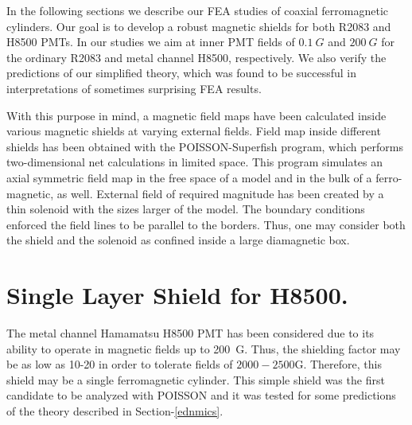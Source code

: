 \documentclass[12pt]{article}
\begin{document}
In the following  sections we describe our  FEA studies of coaxial ferromagnetic cylinders.
Our goal is to develop a  robust
magnetic shields for both  R2083 and H8500 PMTs. 
In our  studies we aim at inner PMT fields  of $0.1~G$ and $200~G$ for the ordinary R2083 and
metal channel  H8500, respectively.   We also  verify the predictions of our 
simplified theory, which was found to be successful in  interpretations of sometimes surprising FEA results.

With this purpose in mind, a magnetic field maps have  been calculated
inside  various magnetic shields at varying  external fields.
Field map inside different  shields has been  obtained with 
the POISSON-Superfish  program,  which performs two-dimensional net calculations 
in  limited space.  This program  simulates an axial symmetric 
field map in the free space of a  model and in the 
bulk of a ferro-magnetic, as well.  External  field of required magnitude  has been
created by a thin solenoid with  the sizes  larger of the model.
The boundary conditions enforced  the field lines to be parallel to the borders.
Thus, one may  consider  both the  shield and the  solenoid as 
confined   inside  a   large diamagnetic box.
 
%





\section{Single Layer Shield for H8500.}
The metal channel Hamamatsu H8500 PMT has been 
considered due to its ability to operate in magnetic fields up to 200~G.
Thus, the shielding factor may be as low as 10-20 in order to tolerate
 fields of $2000-2500$G. Therefore, this shield may be a  single  ferromagnetic cylinder.  
This simple shield  was  the first candidate to be analyzed  with POISSON and  it
was  tested for some predictions of the  theory described in  Section-\ref{ednmics}.
\end{document}
